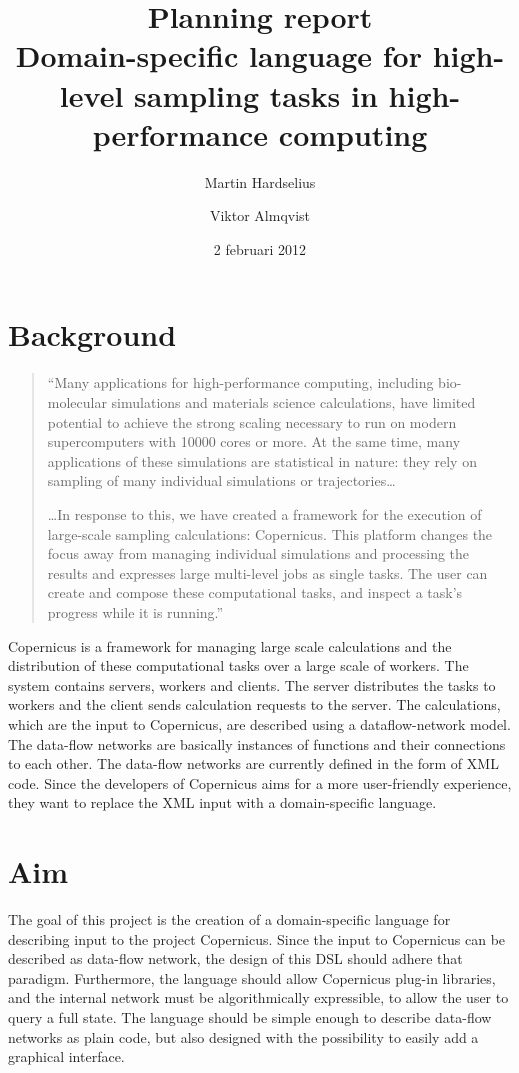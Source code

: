 \documentclass[a4paper]{article}
\title{Planning report\\
  \large{Domain-specific language for high-level
  sampling tasks in high-performance computing
  }
}
\author{Martin Hardselius \and Viktor Almqvist}
\date{2 februari 2012}
\begin{document}
\maketitle
\newpage

\section{Background}
\begin{quotation}
  ``Many applications for high-performance computing, including
  bio-molecular simulations and materials science calculations, have
  limited potential to achieve the strong scaling necessary to run on
  modern supercomputers with 10000 cores or more. At the same time,
  many applications of these simulations are statistical in nature:
  they rely on sampling of many individual simulations or
  trajectories\ldots

  \ldots In response to this, we have created a framework for the
  execution of large-scale sampling calculations: Copernicus. This
  platform changes the focus away from managing individual simulations
  and processing the results and expresses large multi-level jobs as
  single tasks. The user can create and compose these computational
  tasks, and inspect a task's progress while it is running.''
\end{quotation}

Copernicus is a framework for managing large scale calculations and
the distribution of these computational tasks over a large scale of
workers. The system contains servers, workers and clients. The server
distributes the tasks to workers and the client sends calculation
requests to the server. The calculations, which are the input to
Copernicus, are described using a dataflow-network model. The
data-flow networks are basically instances of functions and their
connections to each other. The data-flow networks are currently
defined in the form of XML code. Since the developers of Copernicus
aims for a more user-friendly experience, they want to replace the XML
input with a domain-specific language.

\section{Aim}
The goal of this project is the creation of a domain-specific language
for describing input to the project Copernicus. Since the input to
Copernicus can be described as data-flow network, the design of this
DSL should adhere that paradigm. Furthermore, the language should
allow Copernicus plug-in libraries, and the internal network must be
algorithmically expressible, to allow the user to query a full
state. The language should be simple enough to describe data-flow
networks as plain code, but also designed with the possibility to
easily add a graphical interface.
\end{document}
